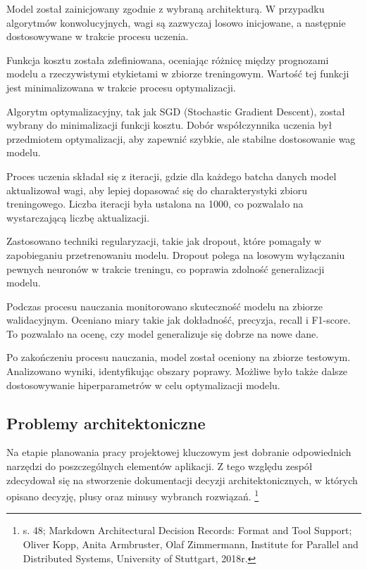 \documentclass[12pt, a4paper, twoside, openany]{book}
\newcommand{\forceindent}{\leavevmode{\parindent=1.3em\indent}}
\begin{document}
Model został zainicjowany zgodnie z wybraną architekturą. W przypadku algorytmów konwolucyjnych, wagi są zazwyczaj losowo inicjowane, a następnie dostosowywane w trakcie procesu uczenia.

Funkcja kosztu została zdefiniowana, oceniając różnicę między prognozami modelu a rzeczywistymi etykietami w zbiorze treningowym.
Wartość tej funkcji jest minimalizowana w trakcie procesu optymalizacji.

Algorytm optymalizacyjny, tak jak SGD (Stochastic Gradient Descent), został wybrany do minimalizacji funkcji kosztu.
Dobór współczynnika uczenia był przedmiotem optymalizacji, aby zapewnić szybkie, ale stabilne dostosowanie wag modelu.

Proces uczenia składał się z iteracji, gdzie dla każdego batcha danych model aktualizował wagi, aby lepiej dopasować się do charakterystyki zbioru treningowego.
Liczba iteracji była ustalona na 1000, co pozwalało na wystarczającą liczbę aktualizacji.

Zastosowano techniki regularyzacji, takie jak dropout, które pomagały w zapobieganiu przetrenowaniu modelu.
Dropout polega na losowym wyłączaniu pewnych neuronów w trakcie treningu, co poprawia zdolność generalizacji modelu.

Podczas procesu nauczania monitorowano skuteczność modelu na zbiorze walidacyjnym.
Oceniano miary takie jak dokładność, precyzja, recall i F1-score. %
To pozwalało na ocenę, czy model generalizuje się dobrze na nowe dane.

Po zakończeniu procesu nauczania, model został oceniony na zbiorze testowym. Analizowano wyniki, identyfikując obszary poprawy.
Możliwe było także dalsze dostosowywanie hiperparametrów w celu optymalizacji modelu.

\subsection{Problemy architektoniczne}

\forceindent Na etapie planowania pracy projektowej kluczowym jest dobranie odpowiednich narzędzi
do poszczególnych elementów aplikacji. Z tego względu zespół zdecydował się na stworzenie
dokumentacji decyzji architektonicznych, w których opisano decyzję, plusy oraz minusy wybranch rozwiązań. \footnote{s. 48; Markdown Architectural Decision Records: Format and Tool Support; Oliver Kopp, Anita Armbruster, Olaf Zimmermann, Institute for Parallel and Distributed Systems, University of Stuttgart, 2018r.}
\end{document}
